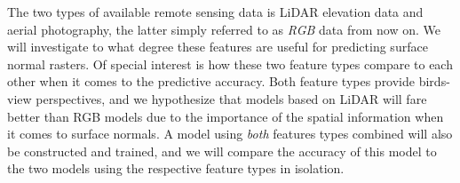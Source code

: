 The two types of available remote sensing data is LiDAR elevation data and aerial photography, the latter simply referred to as \textit{RGB} data from now on.
We will investigate to what degree these features are useful for predicting surface normal rasters.
Of special interest is how these two feature types compare to each other when it comes to the predictive accuracy.
Both feature types provide birds-view perspectives, and we hypothesize that models based on LiDAR will fare better than RGB models due to the importance of the spatial information when it comes to surface normals.
A model using \textit{both} features types combined will also be constructed and trained, and we will compare the accuracy of this model to the two models using the respective feature types in isolation.
